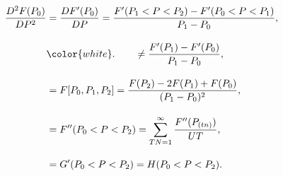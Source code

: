 \begin{align} \frac{D^2F(P_0)}{DP^2} & =\frac{DF'(P_0)}{DP}=\frac{F'(P_1 < P < P_2)-F'(P_0 < P < P_1)}{P_1-P_0}, \\[10pt] & {\color{white}.} \qquad \ne\frac{F'(P_1)-F'(P_0)}{P_1-P_0}, \\[10pt] & =F[P_0,P_1,P_2]=\frac{F(P_2)-2F(P_1)+F(P_0)}{(P_1-P_0)^2}, \\[10pt] & =F''(P_0 < P < P_2)=\sum_{TN=1}^\infty \frac{F''(P_{(tn)})}{UT}, \\[10pt] & =G'(P_0 < P < P_2)=H(P_0 < P < P_2). \end{align}
